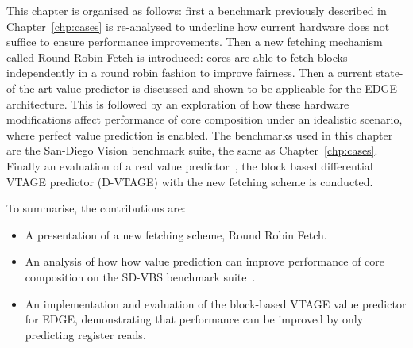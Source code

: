 This chapter is organised as follows: first a benchmark previously described in Chapter~\ref{chp:cases} is re-analysed to underline how current hardware does not suffice to ensure performance improvements.
Then a new fetching mechanism called Round Robin Fetch is introduced: cores are able to fetch blocks independently in a round robin fashion to improve fairness.
Then a current state-of-the art value predictor is discussed and shown to be applicable for the EDGE architecture.
This is followed by an exploration of how these hardware modifications affect performance of core composition under an idealistic scenario, where perfect value prediction is enabled.
The benchmarks used in this chapter are the San-Diego Vision benchmark suite, the same as Chapter~\ref{chp:cases}.
Finally an evaluation of a real value predictor~\cite{peraisBeBop2015}, the block based differential VTAGE predictor (D-VTAGE) with the new fetching scheme is conducted.

To summarise, the contributions are:

\begin{itemize}
\item A presentation of a new fetching scheme, Round Robin Fetch.
\vspace{-1em}
\item An analysis of how how value prediction can improve performance of core composition on the SD-VBS benchmark suite~\cite{sdvbs}.
\vspace{-1em}
\item An implementation and evaluation of the block-based VTAGE value predictor for EDGE, demonstrating that performance can be improved by only predicting register reads.
\end{itemize}